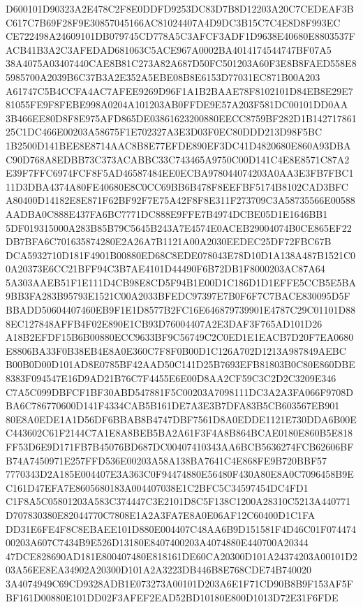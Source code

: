 \documentclass[UTF8,fontset=fandol,zihao=-4,a4paper]{ctexart}
\begin{document}
{{D600101D90323A2E478C2F8E0DDFD9253DC83D7B8D12203A20C7CEDEAF3BC617C7B69F28F9E30857045166AC81024407A4D9DC3B15C7C4E8D8F993EC
CE722498A24609101DB079745CD778A5C3AFCF3ADF1D9638E40680E8803537FACB41B3A2C3AFEDAD681063C5ACE967A0002BA4014174544747BF07A5
38A4075A03407440CAE8B81C273A82A687D50FC501203A60F3E8B8FAED558E85985700A2039B6C37B3A2E352A5EBE08B8E6153D77031EC871B00A203
A61747C5B4CCFA4AC7AFEE9269D96F1A1B2BAAE78F8102101D84EB8E29E781055FE9F8FEBE998A0204A101203AB0FFDE9E57A203F581DC00101DD0AA
3B466EE80D8F8E975AFD865DE03861623200880EECC8759BF282D1B14271786125C1DC466E00203A58675F1E702327A3E3D03F0EC80DDD213D98F5BC
1B2500D141BEE8E8714AAC8B8E77EFDE890EF3DC41D4820680E860A93DBAC90D768A8EDBB73C373ACABBC33C743465A9750C00D141C4E8E8571C87A2
E39F7FFC6974FCF8F5AD46587484EE0ECBA978044074203A0AA3E3FB7FBC111D3DBA4374A80FE40680E8C0CC69BB6B478F8EEFBF5174B8102CAD3BFC
A80400D14182E8E871F62BF92F7E75A42F8F8E311F273709C3A58735566E00588AADBA0C888E437FA6BC7771DC888E9FFE7B4974DCBE05D1E1646BB1
5DF019315000A283B85B79C5645B243A7E4574E0ACEB29004074B0CE865EF22DB7BFA6C701635874280E2A26A7B1121A00A2030EEDEC25DF72FBC67B
DCA5932710D181F4901B00880ED68C8EDE078043E78D10D1A138A487B1521C00A20373E6CC21BFF94C3B7AE4101D44490F6B72DB1F8000203AC87A64
5A303AAEB51F1E111D4CB98E8CD5F94B1E00D1C186D1D1EFFE5CCB5E5BA9BB3FA283B95793E1521C00A2033BFEDC97397E7B0F6F7C7BACE830095D5F
BBADD50604407460EB9F1E1D8577B2FC16E646879739901E4787C29C01101D888EC127848AFFB4F02E890E1CB93D76004407A2E3DAF3F765AD101D26
A18B2EFDF15B6B00880ECC9633BF9C56749C2C0ED1E1EACB7D20F7EA0680E8806BA33F0B38EB4E8A0E360C7F8F0B00D1C126A702D1213A987849AEBC
B00B0D00D101AD8E0785BF42AAD50C141D25B7693EFB81803B0C80E860DBE8383F094547E16D9AD21B76C7F4455E6E00D8AA2CF59C3C2D2C3209E346
C7A5C099DBFCF1BF30ABD547881F5C00203A7098111DC3A2A3FA066F9708DBA6C786770600D141F4334CAB5B161DE7A3E3B7DFA83B5CB603567EB901
80E8A0EDE1A1D56DF6BBAB8B4747DBF7561D8A0EDDE1121E730DDA6B00EC443602C61F2144C7A1E8A8BEB5BA2A61F3F4A8B864BCAE0180E860B5E818
FF53D6E9D171FB7B45076BD687DC00407410343AA6BCB5636274FCB62606BFB74A7450971E257FFD536E00203A58A138BA7641C4E868FE9B720BBF57
7770343D2A185E004407E3A363C0F94474880E56480F430A80E8A0C7096458B9EC161D47EFA7E8605680183A004407038E1C2BFC5C34597454DC4FD1
C1F8A5C05801203A583C374447C3E2101D8C5F138C1200A28310C5213A440771D707830380E82044770C7808E1A2A3FA7E8A0E06AF12C60400D1C1FA
DD31E6FE4F8C8EBAEE101D880E004407C48AA6B9D151581F4D46C01F07447400203A607C7434B9E526D13180E8407400203A4074880E440700A20344
47DCE828690AD181E800407480E818161DE60CA20300D101A24374203A00101D203A56EE8EA34902A20300D101A2A3223DB446B8E768CDE74B740020
3A4074949C69CD9328ADB1E073273A00101D203A6E1F71CD90B8B9F153AF5FBF161D00880E101DD02F3AFEF2EAD52BD10180E800D1013D72E31F6FDE
}}
\end{document}
